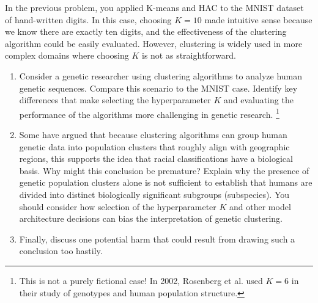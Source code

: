 \documentclass[submit]{../harvardml}
\begin{document}
\begin{problem}

In the previous problem, you applied K-means and HAC to the MNIST dataset of hand-written digits. In this case, choosing $K=10$ made intuitive sense because we know there are exactly ten digits, and the effectiveness of the clustering algorithm could be easily evaluated. However, clustering is widely used in more complex domains where choosing $K$ is not as straightforward.
\begin{enumerate}
  \item Consider a genetic researcher using clustering algorithms to analyze human genetic sequences. Compare this scenario to the MNIST case. Identify key differences that make selecting the hyperparameter $K$ and evaluating the performance of the algorithms more challenging in genetic research.
  \footnote{This is not a purely fictional case! In 2002, Rosenberg et al. used $K = 6$ in their study of genotypes and human population structure.}
  
  \item Some have argued that because clustering algorithms can group human genetic data into population clusters that roughly align with geographic regions, this supports the idea that racial classifications have a biological basis. Why might this conclusion be premature? Explain why the presence of genetic population clusters alone is not sufficient to establish that humans are divided into distinct biologically significant subgroups (subspecies). You should consider how selection of the hyperparameter $K$ and other model architecture decisions can bias the interpretation of genetic clustering.
  
  \item Finally, discuss one potential harm that could result from drawing such a conclusion too hastily.
\end{enumerate}
\end{problem}
\end{document}
